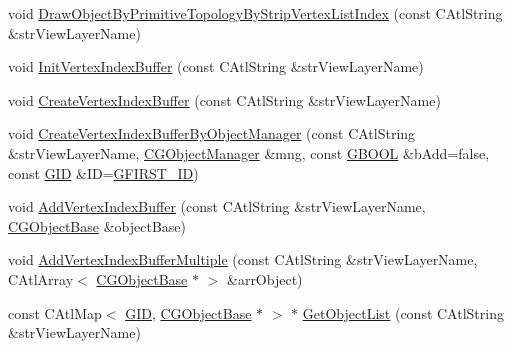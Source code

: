 \begin{DoxyCompactItemize}
void \hyperlink{class_c_g3_d_view_aaff0a9519911ebf483d0415bd30d1592}{Draw\+Object\+By\+Primitive\+Topology\+By\+Strip\+Vertex\+List\+Index} (const C\+Atl\+String \&str\+View\+Layer\+Name)
\item 
void \hyperlink{class_c_g3_d_view_a0dc3d3cf11fba43e6ac7e5fa81234bc9}{Init\+Vertex\+Index\+Buffer} (const C\+Atl\+String \&str\+View\+Layer\+Name)
\item 
void \hyperlink{class_c_g3_d_view_abc2a437838adce2483696c368bad3ec7}{Create\+Vertex\+Index\+Buffer} (const C\+Atl\+String \&str\+View\+Layer\+Name)
\item 
void \hyperlink{class_c_g3_d_view_a272c8860f8b2967a6787da320c902578}{Create\+Vertex\+Index\+Buffer\+By\+Object\+Manager} (const C\+Atl\+String \&str\+View\+Layer\+Name, \hyperlink{class_c_g_object_manager}{C\+G\+Object\+Manager} \&mng, const \hyperlink{_g_types_8h_a2901915743626352a6820c5405f556dc}{G\+B\+O\+O\+L} \&b\+Add=false, const \hyperlink{_g_types_8h_a5b96ecb16d8e437977d12cd40aa6f6d8}{G\+I\+D} \&I\+D=\hyperlink{_g_types_8h_a124fbb974ba5e89342bd060f0e8f09c1}{G\+F\+I\+R\+S\+T\+\_\+\+I\+D})
\item 
void \hyperlink{class_c_g3_d_view_a7e3f5a5609554d257f7ac61d07dad3fa}{Add\+Vertex\+Index\+Buffer} (const C\+Atl\+String \&str\+View\+Layer\+Name, \hyperlink{class_c_g_object_base}{C\+G\+Object\+Base} \&object\+Base)
\item 
void \hyperlink{class_c_g3_d_view_a4155768c1012ecaec52d01598204a73b}{Add\+Vertex\+Index\+Buffer\+Multiple} (const C\+Atl\+String \&str\+View\+Layer\+Name, C\+Atl\+Array$<$ \hyperlink{class_c_g_object_base}{C\+G\+Object\+Base} $\ast$ $>$ \&arr\+Object)
\item 
const C\+Atl\+Map$<$ \hyperlink{_g_types_8h_a5b96ecb16d8e437977d12cd40aa6f6d8}{G\+I\+D}, \hyperlink{class_c_g_object_base}{C\+G\+Object\+Base} $\ast$ $>$ $\ast$ \hyperlink{class_c_g3_d_view_afc6e81cbaee27dfc3092d7f4f6157f57}{Get\+Object\+List} (const C\+Atl\+String \&str\+View\+Layer\+Name)
\end{DoxyCompactItemize}
